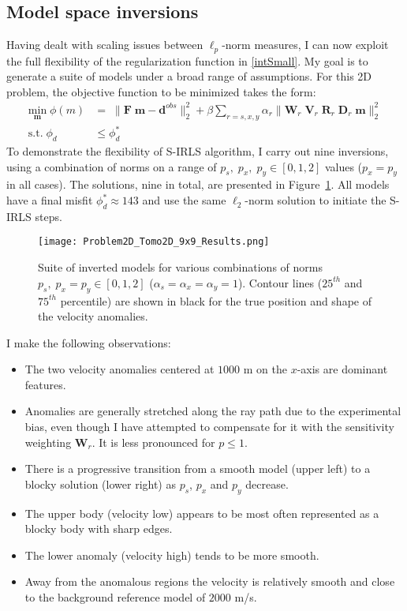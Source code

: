 \subsection{Model space inversions}
Having dealt with scaling issues between $\ell_p$-norm measures, I can now exploit the full flexibility of the regularization function in \eqref{intSmall}.
My goal is to generate a suite of models under a broad range of assumptions.
For this 2D problem, the objective function to be minimized takes the form:
\begin{equation}\label{ObjFun2D}
\begin{split}
\underset{\mathbf{m}}{\text{min}}\; \phi(m) & = \; \|\mathbf{F}\;\mathbf{m} - \mathbf{d}^{obs}\|_2^2 + \beta \sum_{r=s,x,y} \alpha_r \|\mathbf{W}_r \;\mathbf{V}_r\;\mathbf{R}_r\;\mathbf{D}_r \;\mathbf{m}\|_2^2 \\
\text{s.t.} \; \phi_d & \leq \phi_d^* \;
\end{split}
\end{equation}
To demonstrate the flexibility of S-IRLS algorithm, I carry out nine inversions, using a combination of norms on a range of $p_s,\; p_{x},\;p_y \in {[0,1,2]}$ values ($p_x=p_y$ in all cases). The solutions, nine in total, are presented in Figure~\ref{Mixed2DSolutions}. All models have a final misfit $\phi_d^* \approx 143$ and use the same $\ell_2$-norm solution to initiate the S-IRLS steps.
\begin{figure}
\texttt{[image: Problem2D\_Tomo2D\_9x9\_Results.png]}
\caption{Suite of inverted models for various combinations of norms $p_s,\; p_{x}=p_{y} \in {[0,1,2]}$ ($\alpha_s=\alpha_x=\alpha_y=1$). Contour lines ($25^{th}$ and $75^{th}$ percentile) are shown in black for the true position and shape of the velocity anomalies.}
\label{Mixed2DSolutions}
\end{figure}
I make the following observations:
\begin{itemize}
\item The two velocity anomalies centered at $1000$ m on the $x$-axis are dominant features.
\item Anomalies are generally stretched along the ray path due to the experimental bias, even though I have attempted to compensate for it with the sensitivity weighting $\mathbf{W}_r$. It is less pronounced for $p\leq1$.
\item There is a progressive transition from a smooth model (upper left) to a blocky solution (lower right) as $p_s$, $p_{x}$ and $p_y$ decrease.
\item The upper body (velocity low) appears to be most often represented as a blocky body with sharp edges.
\item The lower anomaly (velocity high) tends to be more smooth.
\item Away from the anomalous regions the velocity is relatively smooth and close to the background reference model of $2000$ m/s.
\end{itemize}

